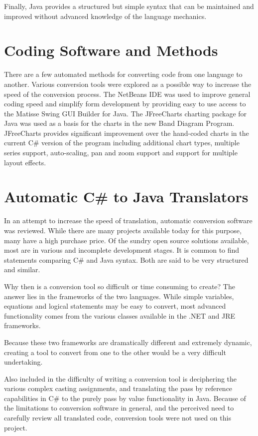 \documentclass[project]{bsu-ms}
\begin{document}
Finally, Java provides a structured but simple syntax that can be maintained and improved without advanced knowledge of the language mechanics.



\section{Coding Software and Methods}\label{sec:codingSoftwareAndMethods}
There are a few automated methods for converting code from one language to another. Various conversion tools were explored as a possible way to increase the speed of the conversion process. The NetBeans IDE was used to improve general coding speed and simplify form development by providing easy to use access to the Matisse Swing GUI Builder for Java. The JFreeCharts charting package for Java was used as a basis for the charts in the new Band Diagram Program. JFreeCharts provides significant improvement over the hand-coded charts in the current C\# version of the program including additional chart types, multiple series support, auto-scaling, pan and zoom support and support for multiple layout effects\cite{band:web3}.



\section{Automatic C\# to Java Translators}\label{sec:automaticTranslator}
In an attempt to increase the speed of translation, automatic conversion software was reviewed. While there are many projects available today for this purpose, many have a high purchase price. Of the sundry open source solutions available, most are in various and incomplete development stages. It is common to find statements comparing C\# and Java syntax. Both are said to be very structured and similar. 

Why then is a conversion tool so difficult or time consuming to create? The answer lies in the frameworks of the two languages. While simple variables, equations and logical statements may be easy to convert, most advanced functionality comes from the various classes available in the .NET and JRE frameworks. 

Because these two frameworks are dramatically different and extremely dynamic, creating a tool to convert from one to the other would be a very difficult undertaking. 

Also included in the difficulty of writing a conversion tool is deciphering the various complex casting assignments, and translating the pass by reference capabilities in C\# to the purely pass by value functionality in Java. Because of the limitations to conversion software in general, and the perceived need to carefully review all translated code, conversion tools were not used on this project. 
\end{document}
